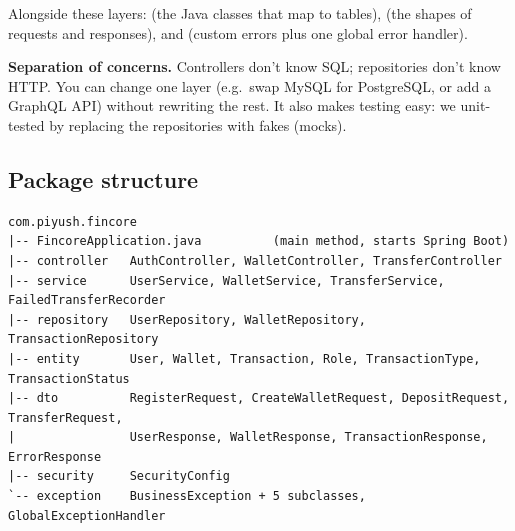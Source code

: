 \documentclass[11pt,a4paper]{article}
\newcommand{\code}[1]{\texttt{\detokenize{#1}}}
\begin{document}
\begin{center}
\end{center}

Alongside these layers: \code{entity/} (the Java classes that map to tables), \code{dto/} (the shapes of
requests and responses), and \code{exception/} (custom errors plus one global error handler).

\begin{whybox}
\textbf{Separation of concerns.} Controllers don't know SQL; repositories don't know HTTP. You can
change one layer (e.g.\ swap MySQL for PostgreSQL, or add a GraphQL API) without rewriting the rest.
It also makes testing easy: we unit-tested \code{TransferService} by replacing the repositories with
fakes (mocks).
\end{whybox}

\subsection{Package structure}
\begin{lstlisting}[style=plain]
com.piyush.fincore
|-- FincoreApplication.java          (main method, starts Spring Boot)
|-- controller   AuthController, WalletController, TransferController
|-- service      UserService, WalletService, TransferService, FailedTransferRecorder
|-- repository   UserRepository, WalletRepository, TransactionRepository
|-- entity       User, Wallet, Transaction, Role, TransactionType, TransactionStatus
|-- dto          RegisterRequest, CreateWalletRequest, DepositRequest, TransferRequest,
|                UserResponse, WalletResponse, TransactionResponse, ErrorResponse
|-- security     SecurityConfig
`-- exception    BusinessException + 5 subclasses, GlobalExceptionHandler
\end{lstlisting}
\end{document}
